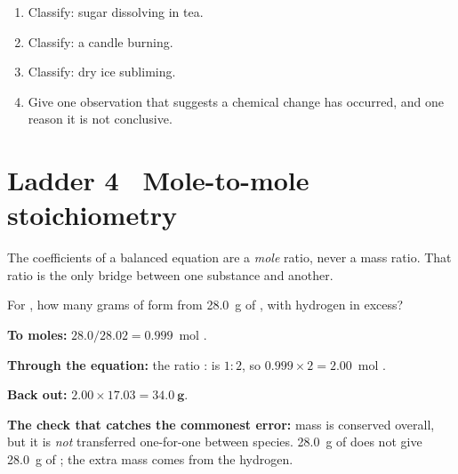 \documentclass{apchem-worksheet}
\begin{document}
\begin{yourturn}
\begin{enumerate}[leftmargin=*,itemsep=0.5em]
  \item Classify: sugar dissolving in tea. \workspace[1.4cm]
  \item Classify: a candle burning. \workspace[1.4cm]
  \item Classify: dry ice subliming. \workspace[1.4cm]
  \item Give one observation that suggests a chemical change has occurred,
        and one reason it is not conclusive. \workspace[2.0cm]
\end{enumerate}
\end{yourturn}

\section*{\sffamily Ladder 4 \textbullet\ Mole-to-mole stoichiometry}

The coefficients of a balanced equation are a \emph{mole} ratio, never a
mass ratio. That ratio is the only bridge between one substance and
another.

\begin{workedexample}
For , how many grams of  form from
\SI{28.0}{\gram} of , with hydrogen in excess?

\textbf{To moles:} $28.0/28.02 = \num{0.999}$~mol .

\textbf{Through the equation:} the ratio : is $1:2$, so
$0.999 \times 2 = \num{2.00}$~mol .

\textbf{Back out:} $2.00 \times 17.03 = \mathbf{34.0~g}$.

\textbf{The check that catches the commonest error:} mass is conserved
overall, but it is \emph{not} transferred one-for-one between species.
\SI{28.0}{\gram} of  does not give \SI{28.0}{\gram} of ;
the extra mass comes from the hydrogen.
\end{workedexample}
\end{document}
